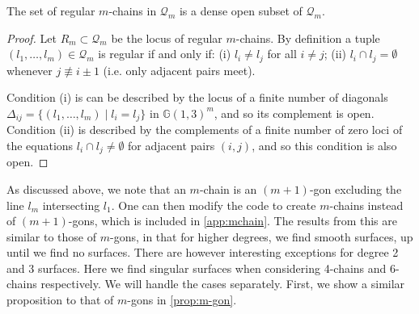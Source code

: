 \begin{corollary}\label{cor:chain-open}
    The set of regular $m$-chains in $\mathcal{Q}_m$ is a dense open subset of $\mathcal{Q}_m$.
\end{corollary}
\begin{proof}
    Let $R_m\subset \mathcal{Q}_m$ be the locus of regular $m$-chains. By definition a tuple $(l_1,\dots,l_m)\in\mathcal{Q}_m$ is regular if and only if:
    (i) $l_i\neq l_j$ for all $i\neq j$; 
    (ii) $l_i\cap l_j=\emptyset$ whenever $j\not\equiv i\pm 1$ (i.e. only adjacent pairs meet).

    Condition (i) is can be described by the locus of a finite number of diagonals $\Delta_{ij}=\{(l_1,\dots,l_m)\mid l_i=l_j\}$ in $\mathbb{G}(1,3)^m$, and so its complement is open. Condition (ii) is described by the complements of a finite number of zero loci of the equations $l_i \cap l_j \neq \emptyset$ for adjacent pairs $(i,j)$, and so this condition is also open.
\end{proof}
%     


As discussed above, we note that an $m$-chain is an $(m+1)$-gon excluding the line $l_m$ intersecting $l_1$. One can then modify the code to create $m$-chains instead of $(m+1)$-gons, which is included in \cref{app:mchain}. The results from this are similar to those of $m$-gons, in that for higher degrees, we find smooth surfaces, up until we find no surfaces. There are however interesting exceptions for degree 2 and 3 surfaces. Here we find singular surfaces when considering 4-chains and 6-chains respectively. We will handle the cases separately. First, we show a similar proposition to that of $m$-gons in \cref{prop:m-gon}.

